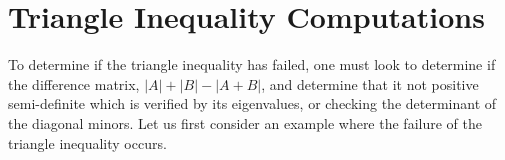 \section{Triangle Inequality Computations}
To determine if the triangle inequality has failed, one must look to determine if the difference matrix, $|A|+|B|-|A+B|$, and determine that it not positive semi-definite which is verified by its eigenvalues,
or checking the determinant of the diagonal minors. Let us first consider an example where the failure of the triangle inequality occurs.



